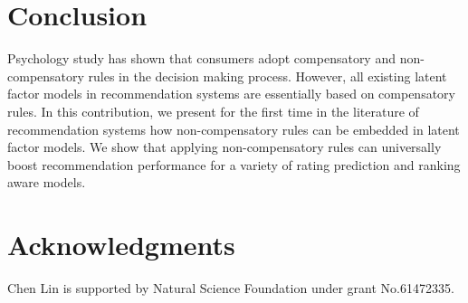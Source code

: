 \documentclass[letterpaper]{article} %
\begin{document}
\section{Conclusion}\label{sec:conclusion}
Psychology study has shown that consumers adopt compensatory and non-compensatory rules in the decision making process. However, all existing latent factor models in recommendation systems are essentially based on compensatory rules. In this contribution, we present for the first time in the literature of recommendation systems how non-compensatory rules can be embedded in latent factor models. We show that applying non-compensatory rules can universally boost recommendation performance for a variety of rating prediction and ranking aware models. 

\section{ Acknowledgments}
Chen Lin is supported by Natural Science Foundation under grant No.61472335. 


\end{document}
